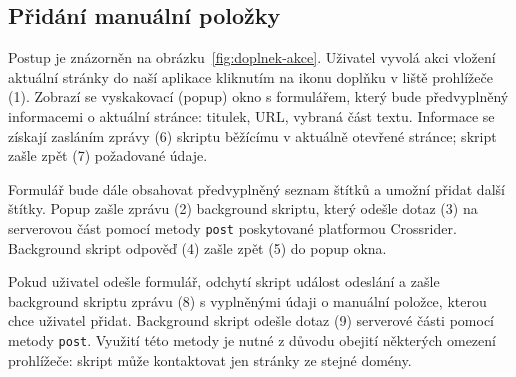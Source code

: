\subsection{Přidání manuální položky}

Postup je znázorněn na obrázku~\ref{fig:doplnek-akce}.
Uživatel vyvolá akci vložení aktuální stránky do naší aplikace kliknutím na ikonu doplňku v liště prohlížeče (1).
Zobrazí se vyskakovací (popup) okno s formulářem, který bude předvyplněný informacemi o aktuální stránce: titulek, URL, vybraná část textu.
Informace se získají zasláním zprávy (6) skriptu běžícímu v aktuálně otevřené stránce; skript zašle zpět (7) požadované údaje.

Formulář bude dále obsahovat předvyplněný seznam štítků a umožní přidat další štítky.
Popup zašle zprávu (2) background skriptu, který odešle dotaz (3) na serverovou část pomocí metody \verb|post| poskytované platformou Crossrider.
Background skript odpověď (4) zašle zpět (5) do popup okna.

Pokud uživatel odešle formulář, odchytí skript událost odeslání a zašle background skriptu zprávu (8) s vyplněnými údaji o manuální položce, kterou chce uživatel přidat.
Background skript odešle dotaz (9) serverové části pomocí metody \verb|post|.
Využití této metody je nutné z důvodu obejití některých omezení prohlížeče: skript může kontaktovat jen stránky ze stejné domény.
